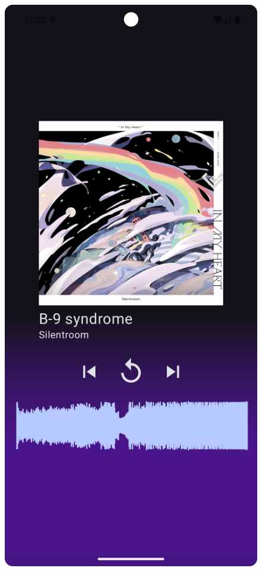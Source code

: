 \begin{figure}[H]
	\centering
	\includegraphics[width=1\textwidth]{images/test_player_stopped.png}
	\caption{}
	\label{fig:test_player_stopped}
\end{figure}

